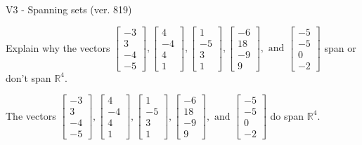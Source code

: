 \begin{exercise}
  \begin{exerciseTitle}V3 - Spanning sets (ver. 819)\end{exerciseTitle}
  \begin{exerciseStatement}
    Explain why the vectors \(\left[\begin{array}{r}
-3 \\
3 \\
-4 \\
-5
\end{array}\right] , \left[\begin{array}{r}
4 \\
-4 \\
4 \\
1
\end{array}\right] , \left[\begin{array}{r}
1 \\
-5 \\
3 \\
1
\end{array}\right] , \left[\begin{array}{r}
-6 \\
18 \\
-9 \\
9
\end{array}\right] , \text{ and } \left[\begin{array}{r}
-5 \\
-5 \\
0 \\
-2
\end{array}\right]\) span or don't span \(\mathbb{R}^4\). 
	


  \end{exerciseStatement}
  \begin{exerciseAnswer}
   The vectors \(\left[\begin{array}{r}
-3 \\
3 \\
-4 \\
-5
\end{array}\right] , \left[\begin{array}{r}
4 \\
-4 \\
4 \\
1
\end{array}\right] , \left[\begin{array}{r}
1 \\
-5 \\
3 \\
1
\end{array}\right] , \left[\begin{array}{r}
-6 \\
18 \\
-9 \\
9
\end{array}\right] , \text{ and } \left[\begin{array}{r}
-5 \\
-5 \\
0 \\
-2
\end{array}\right]\) 
  	 do  
	span \(\mathbb{R}^4\).
  



\end{exerciseAnswer}
\end{exercise}
